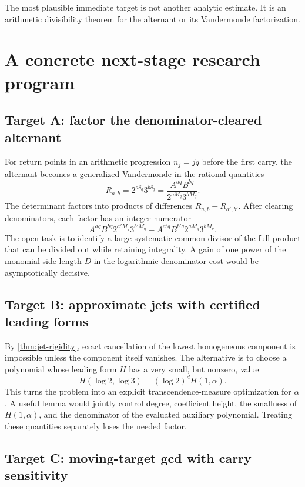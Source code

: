 \documentclass[11pt]{article}
\theoremstyle{definition}
\theoremstyle{remark}
\begin{document}
The most plausible immediate target is not another analytic estimate. It is an arithmetic divisibility theorem for the alternant or its Vandermonde factorization.

\section{A concrete next-stage research program}\label{sec:program}

\subsection{Target A: factor the denominator-cleared alternant}

For return points in an arithmetic progression $n_j=jq$ before the first carry, the alternant becomes a generalized Vandermonde in the rational quantities
\[
 R_{a,b}=2^{a\delta_q}3^{b\delta_q}
 =\frac{A^{aq}B^{bq}}{2^{aM_q}3^{bM_q}}.
\]
The determinant factors into products of differences $R_{a,b}-R_{a',b'}$. After clearing denominators, each factor has an integer numerator
\[
 A^{aq}B^{bq}2^{a'M_q}3^{b'M_q}
 -A^{a'q}B^{b'q}2^{aM_q}3^{bM_q}.
\]
The open task is to identify a large systematic common divisor of the full product that can be divided out while retaining integrality. A gain of one power of the monomial side length $D$ in the logarithmic denominator cost would be asymptotically decisive.

\subsection{Target B: approximate jets with certified leading forms}

By \cref{thm:jet-rigidity}, exact cancellation of the lowest homogeneous component is impossible unless the component itself vanishes. The alternative is to choose a polynomial whose leading form $H$ has a very small, but nonzero, value
\[
 H(\log2,\log3)=(\log2)^dH(1,\alpha).
\]
This turns the problem into an explicit transcendence-measure optimization for $\alpha$. A useful lemma would jointly control degree, coefficient height, the smallness of $H(1,\alpha)$, and the denominator of the evaluated auxiliary polynomial. Treating these quantities separately loses the needed factor.

\subsection{Target C: moving-target gcd with carry sensitivity}
\end{document}
